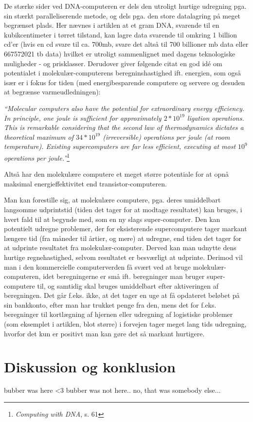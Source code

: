 \documentclass[10pt,a4paper]{article}
\newcommand{\citat}[2]{\begin{justify}\textit{``#1''}\hspace{0.1cm}\footnote{#2}\end{justify}}
\begin{document}
De stærke sider ved DNA-computeren er dels den utroligt hurtige udregning pga. 
sin stærkt paralleliserende metode, og dels pga. den store datalagring på meget 
begrænset plads. Her nævnes i artiklen at et gram DNA, svarende til en 
kubikcentimeter i tørret tilstand, kan lagre data svarende til omkring 1 billion
 cd'er (hvis en cd svare til ca. 700mb, svare det altså til 700 billioner mb 
 data eller 667572021 tb data) hvilket er utroligt sammenlignet med dagens 
 teknologiske muligheder - og prisklasser. Derudover giver følgende citat en god
  idé om potentialet i molekulær-computerens beregninshastighed ift. energien, 
  som også især er i fokus for tiden (med energibesparende computere og servere 
  og desuden at begrænse varmeudledningen):
\citat{Molecular computers also have the potential for extraordinary energy 
efficiency. In principle, one joule is sufficient for approximately $2*10^{19}$ 
ligation operations. This is remarkable considering that the second law of 
thermodynamics dictates a theoretical maximum of $34*10^{19}$ (irreversible) 
operations per joule (at room temperature). Existing supercomputers are far less
 efficient, executing at most $10^{9}$ operations per joule.}{\textit{Computing 
 with DNA}, s. 61}
Altså har den molekulære computere et meget større potentiale for at opnå 
maksimal energieffektivitet end transistor-computeren.

Man kan forestille sig, at molekulære computere, pga. deres umiddelbart 
langsomme udprintstid (tiden det tager for at modtage resultatet) kan bruges, i 
hvert fald til at begynde med, som en ny slags super-computer. Den kan 
potentielt udregne problemer, der for eksisterende supercomputere tager markant 
længere tid (fra måneder til årtier, og mere) at udregne, end tiden det tager 
for at udprinte resultatet fra molekulær-computer. Derved kan man udnytte dens 
hurtige regnehastighed, selvom resultatet er besværligt at udprinte. Derimod vil
 man i den kommercielle computerverden få svært ved at bruge 
 molekulær-computeren, idet beregningerne er små ift. beregninger man bruger 
 super-computere til, og samtidig skal bruges umiddelbart efter aktiveringen af 
 beregningen. Det går f.eks. ikke, at det tager en uge at få opdateret beløbet 
 på sin bankkonto, efter man har trukket penge fra den, mens det for f.eks. 
 beregninger til kortlægning af hjernen eller udregning af logistiske problemer 
 (som eksemplet i artiklen, blot større) i forvejen tager meget lang tids 
 udregning, hvorfor det kun er positivt man kan gøre det så markant hurtigere.

\section{Diskussion og konklusion}
bubber was here <3
bubber was not here.. no, that was somebody else...
\end{document}
